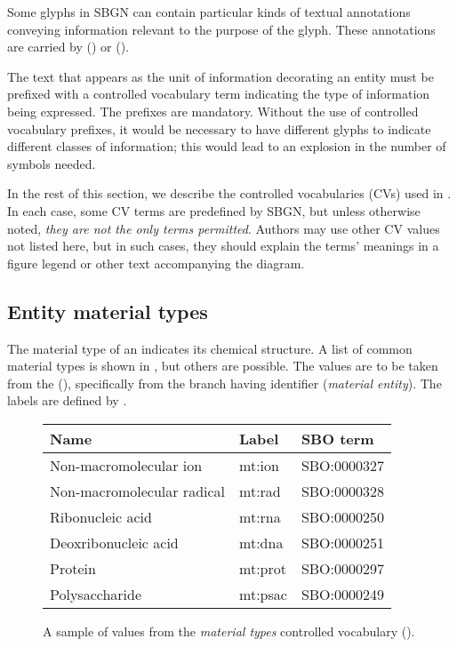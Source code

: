 \color{blue}

Some glyphs in SBGN \ERs can contain particular kinds of textual annotations conveying information relevant to the purpose of the glyph.  These annotations are carried by  () or  ().

The text that appears as the unit of information decorating an entity must be prefixed with a controlled vocabulary term indicating the type of information being expressed.  The prefixes are mandatory.  Without the use of controlled vocabulary prefixes, it would be necessary to have different glyphs to indicate different classes of information; this would lead to an explosion in the number of symbols needed.

In the rest of this section, we describe the controlled vocabularies (CVs) used in \SBGNERLone.  In each case, some CV terms are predefined by SBGN, but unless otherwise noted, \emph{they are not the only terms permitted}.  Authors may use other CV values not listed here, but in such cases, they should explain the terms' meanings in a figure legend or other text accompanying the diagram.

\subsection{Entity material types}
\label{sec:material-types-cv}

The material type of an  indicates its chemical structure.  A list of common material types is shown in , but others are possible.  The values are to be taken from the \sbo (\sbourl), specifically from the branch having identifier  (\emph{material entity}).  The labels are defined by \SBGNERLone.

\begin{figure}[h]
  \centering
  \begin{tabular}{l>{\ttfamily}ll}
    \toprule
    \textbf{Name}              & \textbf{\rmfamily Label} & \textbf{SBO term} \\
    \midrule
    Non-macromolecular ion     & mt:ion  & SBO:0000327\\
    Non-macromolecular radical & mt:rad  & SBO:0000328\\
    Ribonucleic acid           & mt:rna  & SBO:0000250\\
    Deoxribonucleic acid       & mt:dna  & SBO:0000251\\
    Protein                    & mt:prot & SBO:0000297\\
    Polysaccharide             & mt:psac & SBO:0000249\\
    \bottomrule
  \end{tabular}
  \caption{A sample of values from the \emph{material types} controlled
    vocabulary ().}
  \label{fig:material-types-cv}
\end{figure}

